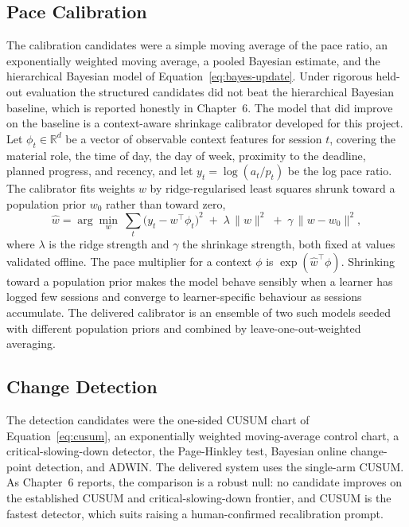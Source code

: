 \subsection{Pace Calibration}
The calibration candidates were a simple moving average of the pace ratio, an exponentially weighted moving average, a pooled Bayesian estimate, and the hierarchical Bayesian model of Equation~\eqref{eq:bayes-update}. Under rigorous held-out evaluation the structured candidates did not beat the hierarchical Bayesian baseline, which is reported honestly in Chapter~6. The model that did improve on the baseline is a context-aware shrinkage calibrator developed for this project. Let $\phi_t \in \mathbb{R}^d$ be a vector of observable context features for session $t$, covering the material role, the time of day, the day of week, proximity to the deadline, planned progress, and recency, and let $y_t = \log(a_t/p_t)$ be the log pace ratio. The calibrator fits weights $w$ by ridge-regularised least squares shrunk toward a population prior $w_0$ rather than toward zero,
\begin{equation}
\hat{w} = \arg\min_{w}\ \sum_t \big(y_t - w^{\top}\phi_t\big)^2 \; + \; \lambda\,\lVert w \rVert^2 \; + \; \gamma\,\lVert w - w_0 \rVert^2,
\label{eq:enriched}
\end{equation}
where $\lambda$ is the ridge strength and $\gamma$ the shrinkage strength, both fixed at values validated offline. The pace multiplier for a context $\phi$ is $\exp(\hat{w}^{\top}\phi)$. Shrinking toward a population prior makes the model behave sensibly when a learner has logged few sessions and converge to learner-specific behaviour as sessions accumulate. The delivered calibrator is an ensemble of two such models seeded with different population priors and combined by leave-one-out-weighted averaging.

\subsection{Change Detection}
The detection candidates were the one-sided CUSUM chart of Equation~\eqref{eq:cusum}, an exponentially weighted moving-average control chart, a critical-slowing-down detector, the Page-Hinkley test, Bayesian online change-point detection, and ADWIN. The delivered system uses the single-arm CUSUM. As Chapter~6 reports, the comparison is a robust null: no candidate improves on the established CUSUM and critical-slowing-down frontier, and CUSUM is the fastest detector, which suits raising a human-confirmed recalibration prompt.

